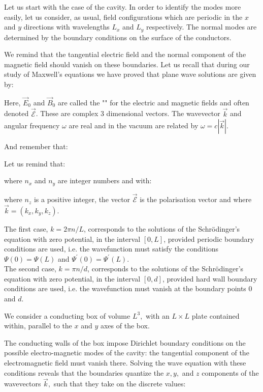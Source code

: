 	Let us start with the case of the cavity. In order to identify the modes more easily, let us consider, as usual, field configurations which are periodic in the $x$ and $y$ directions with wavelengths $L_{x}$ and $L_{y}$ respectively. The normal modes are determined by the boundary conditions on the surface of the conductors. 
	
	We remind that the tangential electric field and the normal component of the magnetic field should vanish on these boundaries. Let us recall that during our study of Maxwell's equations we have proved that plane wave solutions are given by:
	
	Here, $\vec{E}_{0}$ and $\vec{B}_{0}$ are called the "" for the electric and magnetic fields and often denoted $\vec{\mathcal{E}}$. These are complex 3 dimensional vectors. The wavevector $\vec{k}$ and angular frequency $\omega$ are real and in the vacuum are related by $\omega=c|\vec{k}|$. 
	
	And remember that:
	
	Let us remind that:
	
	where $n_{x}$ and $n_{y}$ are integer numbers and with:
	
	where $n_{z}$ is a positive integer, the vector $\vec{\mathcal{E}}$ is the polarisation vector and where $\vec{k}=\left(k_{x}, k_{y}, k_{z}\right)$.
	
	\begin{tcolorbox}[title=Remark,colframe=black,arc=10pt]
	The first case, $k=2 \pi n / L$, corresponds to the solutions of the Schrödinger's equation with zero potential, in the interval $[0, L]$, provided periodic boundary conditions are used, i.e. the wavefunction must satisfy the conditions $\Psi(0)=\Psi(L)$ and $\Psi^{\prime}(0)=\Psi^{\prime}(L)$.\\
	
	The second case, $k=\pi n / d$, corresponds to the solutions of the Schrödinger's equation with zero potential, in the interval $[0, d]$, provided hard wall boundary conditions are used, i.e. the wavefunction must vanish at the boundary points 0 and $d$.
	\end{tcolorbox}
	We consider a conducting box of volume $L^{3},$ with an $L \times L$ plate contained within, parallel to the $x$ and $y$ axes of the box.

	The conducting walls of the box impose Dirichlet boundary conditions on the possible electro-magnetic modes of the cavity: the tangential component of the electromagnetic field must vanish there. Solving the wave equation with these conditions reveals that the boundaries quantize the $x, y,$ and $z$ components of the wavevectors $\vec{k},$ such that they take on the discrete values:
	

